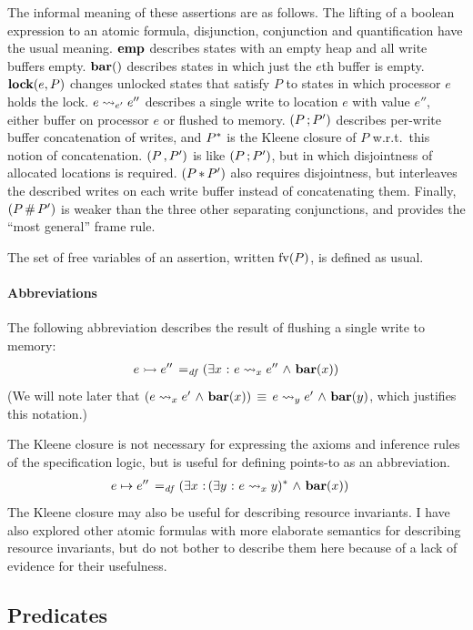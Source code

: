 \documentclass[11pt]{article}
\begin{document}
The informal meaning of these assertions are as follows. The lifting of a boolean expression to an atomic formula, disjunction, conjunction and quantification have the usual meaning. $\mathbf{emp}$ describes states with an empty heap and all write buffers empty. $\fbar$ describes states in which just the $e$th buffer is empty. $\mathbf{lock}(e,P)$ changes unlocked states that satisfy $P$ to states in which processor $e$ holds the lock. $e \leadsto_{e'} e''$ describes a single write to location $e$ with value $e''$, either buffer on processor $e$ or flushed to memory. $(P \operatorname{;} P')$ describes per-write buffer concatenation of writes, and $P^{\ast}$ is the Kleene closure of $P$ w.r.t.~this notion of concatenation. $(P \operatorname{,} P')$ is like $(P \operatorname{;} P')$, but in which disjointness of allocated locations is required. $(P \operatorname{\ast} P')$ also requires disjointness, but interleaves the described writes on each write buffer instead of concatenating them. Finally, $(P \operatorname{\#} P')$ is weaker than the three other separating conjunctions, and provides the ``most general'' frame rule. 

The set of free variables of an assertion, written $\mathrm{fv}(P)$, is defined as usual. 

\paragraph{Abbreviations} The following abbreviation describes the result of flushing a single write to memory: \begin{align*}
	e \rightarrowtail e'' \operatorname{\;=_{\mathit{df}}\;} & (\exists x \operatorname{\,:\,} e \leadsto_{x} e'' \operatorname{\,\wedge\,} \mathbf{bar}(x)) \\
\end{align*} (We will note later that $(e \leadsto_{x} e' \operatorname{\,\wedge\,} \mathbf{bar}(x))\,\equiv\, e \leadsto_{y} e' \operatorname{\,\wedge\,} \mathbf{bar}(y)$, which justifies this notation.)

The Kleene closure is not necessary for expressing the axioms and inference rules of the specification logic, but is useful for defining points-to as an abbreviation. \begin{align*}
	e \mapsto e'' \operatorname{\;=_{\mathit{df}}\;} & (\exists x \operatorname{\,:\,} (\exists y \operatorname{\,:\,} e \leadsto_{x} y)^{\ast} \operatorname{\,\wedge\,} \mathbf{bar}(x))
\end{align*} The Kleene closure may also be useful for describing resource invariants. I have also explored other atomic formulas with more elaborate semantics for describing resource invariants, but do not bother to describe them here because of a lack of evidence for their usefulness.

\subsection{Predicates}
\label{sec:predicates}
\end{document}
